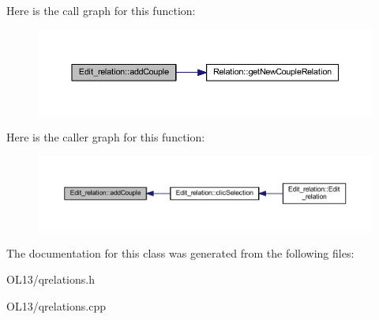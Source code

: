 Here is the call graph for this function\+:\nopagebreak
\begin{figure}[H]
\begin{center}
\leavevmode
\includegraphics[width=350pt]{class_edit__relation_a06254b8a5265ba82160c6ab62bbf9101_cgraph}
\end{center}
\end{figure}
Here is the caller graph for this function\+:\nopagebreak
\begin{figure}[H]
\begin{center}
\leavevmode
\includegraphics[width=350pt]{class_edit__relation_a06254b8a5265ba82160c6ab62bbf9101_icgraph}
\end{center}
\end{figure}


The documentation for this class was generated from the following files\+:\begin{DoxyCompactItemize}
\item 
O\+L13/qrelations.\+h\item 
O\+L13/qrelations.\+cpp\end{DoxyCompactItemize}
